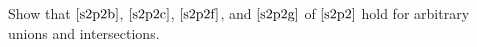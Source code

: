 \documentclass[../main.tex]{subfiles}
\begin{document}
\problem{}\label{s2p3}

Show that \(\ref{s2p2b}\), \(\ref{s2p2c}\), \(\ref{s2p2f}\), and \(\ref{s2p2g}\)
of \(\ref{s2p2}\) hold for arbitrary unions and intersections.






\end{document}
